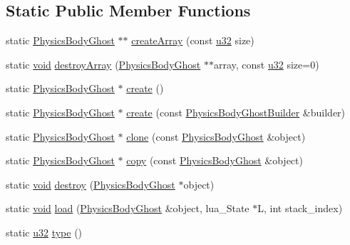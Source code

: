 \subsection*{Static Public Member Functions}
\begin{DoxyCompactItemize}
\item 
static \mbox{\hyperlink{classnjli_1_1_physics_body_ghost}{Physics\+Body\+Ghost}} $\ast$$\ast$ \mbox{\hyperlink{classnjli_1_1_physics_body_ghost_a82c9fbfa4acc13deef6493ae7cd5840e}{create\+Array}} (const \mbox{\hyperlink{_util_8h_a10e94b422ef0c20dcdec20d31a1f5049}{u32}} size)
\item 
static \mbox{\hyperlink{_thread_8h_af1e856da2e658414cb2456cb6f7ebc66}{void}} \mbox{\hyperlink{classnjli_1_1_physics_body_ghost_aef9155fedb503e9d7d57f8f803de18ce}{destroy\+Array}} (\mbox{\hyperlink{classnjli_1_1_physics_body_ghost}{Physics\+Body\+Ghost}} $\ast$$\ast$array, const \mbox{\hyperlink{_util_8h_a10e94b422ef0c20dcdec20d31a1f5049}{u32}} size=0)
\item 
static \mbox{\hyperlink{classnjli_1_1_physics_body_ghost}{Physics\+Body\+Ghost}} $\ast$ \mbox{\hyperlink{classnjli_1_1_physics_body_ghost_a7434dc568f080596a8f87a35e60343cf}{create}} ()
\item 
static \mbox{\hyperlink{classnjli_1_1_physics_body_ghost}{Physics\+Body\+Ghost}} $\ast$ \mbox{\hyperlink{classnjli_1_1_physics_body_ghost_aff9751cceeb013ff72d5c7a187f7337c}{create}} (const \mbox{\hyperlink{classnjli_1_1_physics_body_ghost_builder}{Physics\+Body\+Ghost\+Builder}} \&builder)
\item 
static \mbox{\hyperlink{classnjli_1_1_physics_body_ghost}{Physics\+Body\+Ghost}} $\ast$ \mbox{\hyperlink{classnjli_1_1_physics_body_ghost_a064764d7ba64bf280729bdb0c6d17743}{clone}} (const \mbox{\hyperlink{classnjli_1_1_physics_body_ghost}{Physics\+Body\+Ghost}} \&object)
\item 
static \mbox{\hyperlink{classnjli_1_1_physics_body_ghost}{Physics\+Body\+Ghost}} $\ast$ \mbox{\hyperlink{classnjli_1_1_physics_body_ghost_ab50b73dd844cd6d9aa1304df0367da16}{copy}} (const \mbox{\hyperlink{classnjli_1_1_physics_body_ghost}{Physics\+Body\+Ghost}} \&object)
\item 
static \mbox{\hyperlink{_thread_8h_af1e856da2e658414cb2456cb6f7ebc66}{void}} \mbox{\hyperlink{classnjli_1_1_physics_body_ghost_a44e61ce35d636ee399d28cdf2eb69bce}{destroy}} (\mbox{\hyperlink{classnjli_1_1_physics_body_ghost}{Physics\+Body\+Ghost}} $\ast$object)
\item 
static \mbox{\hyperlink{_thread_8h_af1e856da2e658414cb2456cb6f7ebc66}{void}} \mbox{\hyperlink{classnjli_1_1_physics_body_ghost_a05c9dcfdbcd586c1f670eb7aa5d6dcb7}{load}} (\mbox{\hyperlink{classnjli_1_1_physics_body_ghost}{Physics\+Body\+Ghost}} \&object, lua\+\_\+\+State $\ast$L, int stack\+\_\+index)
\item 
static \mbox{\hyperlink{_util_8h_a10e94b422ef0c20dcdec20d31a1f5049}{u32}} \mbox{\hyperlink{classnjli_1_1_physics_body_ghost_a899bdc02ac8dc04add7a17cc8a820280}{type}} ()
\end{DoxyCompactItemize}
